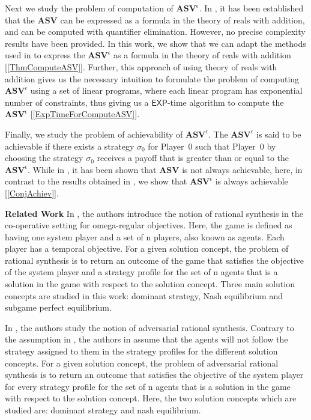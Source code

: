 Next we study the problem of computation of $\mathbf{ASV}^{\epsilon}$. In \cite{FGR20}, it has been established that the $\mathbf{ASV}$ can be expressed as a formula in the theory of reals with addition, and can be computed with quantifier elimination. However, no precise complexity results have been provided. In this work, we show that we can adapt the methods used in \cite{FGR20} to express the $\mathbf{ASV}^{\epsilon}$ as a formula in the theory of reals with addition [\cref{ThmComputeASV}]. Further, this approach of using theory of reals with addition gives us the necessary intuition to formulate the problem of computing $\mathbf{ASV}^{\epsilon}$ using a set of linear programs, where each linear program has exponential number of constraints, thus giving us a $\mathsf{EXP}$-time algorithm to compute the $\mathbf{ASV}^{\epsilon}$ [\cref{ExpTimeForComputeASV}]. 

Finally, we study the problem of achievability of $\mathbf{ASV}^{\epsilon}$. The $\mathbf{ASV}^{\epsilon}$ is said to be achievable if there exists a strategy $\sigma_0$ for Player~0 such that Player~0 by choosing the strategy $\sigma_0$ receives a payoff that is greater than or equal to the $\mathbf{ASV}^{\epsilon}$. While in \cite{FGR20}, it has been shown that $\mathbf{ASV}$ is not always achievable, here, in contrast to the results obtained in \cite{FGR20}, we show that $\mathbf{ASV}^{\epsilon}$ is always achievable [\cref{ConjAchiev}].

\textbf{Related Work} In \cite{FKL10}, the authors introduce the notion of rational synthesis in the co-operative setting for omega-regular objectives. Here, the game is defined as having one system player and a set of n players, also known as agents. Each player has a temporal objective. For a given solution concept, the problem of rational synthesis is to return an outcome of the game that satisfies the objective of the system player and a strategy profile for the set of n agents that is a solution in the game with respect to the solution concept. Three main solution concepts are studied in this work: dominant strategy, Nash equilibrium and subgame perfect equilibrium. 

In \cite{KPV16}, the authors study the notion of adversarial rational synthesis. Contrary to the assumption in \cite{FKL10}, the authors in \cite{KPV16} assume that the agents will not follow the strategy assigned to them in the strategy profiles for the different solution concepts. For a given solution concept, the problem of adversarial rational synthesis is to return an outcome that satisfies the objective of the system player for every strategy profile for the set of n agents that is a solution in the game with respect to the solution concept. Here, the two solution concepts which are studied are: dominant strategy and nash equilibrium.

